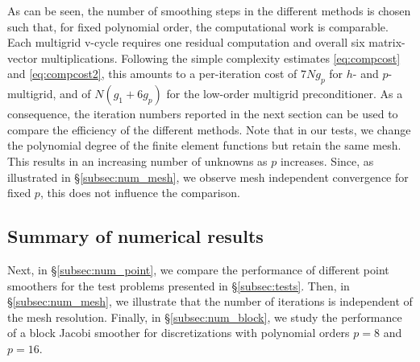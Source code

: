 \documentclass[smallcondensed,final]{svjour3}     %
\begin{document}
\begin{itemize}
\end{itemize}

As can be seen, the number of smoothing steps in the different methods
is chosen such that, for fixed polynomial order, the computational
work is comparable. Each multigrid v-cycle requires one residual
computation and overall six matrix-vector multiplications.  Following
the simple complexity estimates \eqref{eq:compcost} and
\eqref{eq:compcost2}, this amounts to a per-iteration cost of $7Ng_p$
for $h$- and $p$-multigrid, and of $N(g_1+6g_p)$ for the low-order
multigrid preconditioner. As a consequence, the iteration numbers
reported in the next section can be used to compare
the efficiency of the different methods.
%
Note that in our tests, we change the polynomial degree of the
finite element functions but retain the same mesh. This results in an
increasing number of unknowns as $p$ increases. Since, as illustrated
in \S\ref{subsec:num_mesh}, we observe mesh independent convergence
for fixed $p$, this does not influence the comparison.


\subsection{Summary of numerical results}\label{subsec:results}
Next, in \S\ref{subsec:num_point}, we compare the performance of
different point smoothers for the test problems presented in
\S\ref{subsec:tests}. Then, in \S\ref{subsec:num_mesh}, we
illustrate that the number of iterations is independent of the mesh
resolution. Finally, in \S\ref{subsec:num_block}, we study the
performance of a block Jacobi smoother for discretizations with
polynomial orders $p=8$ and $p=16$.
\end{document}
